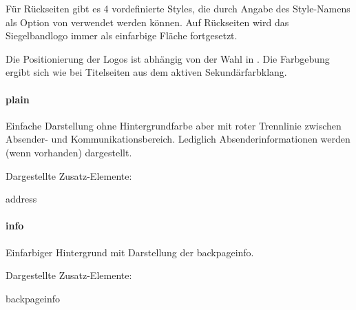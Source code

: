 Für Rückseiten gibt es 4 vordefinierte Styles, die durch Angabe des
Style-Namens als Option von  verwendet werden können.
Auf Rückseiten wird das Siegelbandlogo immer als einfarbige Fläche fortgesetzt.

Die Positionierung der Logos ist abhängig von der Wahl in .
Die Farbgebung ergibt sich wie bei Titelseiten aus dem aktiven Sekundärfarbklang.

  \begin{minipage}[t]{0.33\textwidth}
    \null\centering\sffamily
  \end{minipage}%
  \hfill
  \begin{minipage}[t]{0.6\textwidth}
    \paragraph{plain}
    \par
    Einfache Darstellung ohne Hintergrundfarbe aber mit
    roter Trennlinie zwischen Absender- und Kommunikationsbereich.
    Lediglich Absenderinformationen werden (wenn vorhanden) dargestellt.
    \par\bigskip
    \par\bigskip
    Dargestellte Zusatz-Elemente:
    \begin{compactitem}\ttfamily
      \item address
    \end{compactitem}
  \end{minipage}

  \begin{minipage}[t]{0.33\textwidth}
    \null\centering\sffamily
  \end{minipage}%
  \hfill
  \begin{minipage}[t]{0.6\textwidth}
    \paragraph{info}
    \par
    Einfarbiger Hintergrund mit Darstellung der backpageinfo.
    \par\bigskip
    \par\bigskip
    Dargestellte Zusatz-Elemente:
    \begin{compactitem}\ttfamily
      \item backpageinfo
    \end{compactitem}
  \end{minipage}

